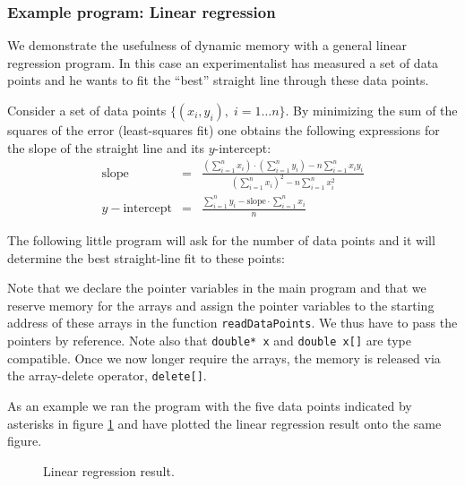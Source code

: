 
\subsubsection{Example program: Linear regression}

We demonstrate the usefulness of dynamic memory with a general linear regression
program. In this case an experimentalist has measured a set of data points and he
wants to fit the ``best'' straight line through these data points.

Consider a set of data points $\{(x_i,y_i), \; i=1 \dots n\}$.
By minimizing the sum of the squares of the error (least-squares fit) one obtains the
following expressions for the slope of the straight line and its $y$-intercept:
\begin{eqnarray}
  \mbox{slope} &=& \frac{\left( \sum_{i=1}^n x_i \right) \cdot \left( \sum_{i=1}^n y_i \right)
                      - n \sum_{i=1}^n x_i y_i }
                        {\left( \sum_{i=1}^n x_i \right)^2
                      - n \sum_{i=1}^n x_i^2 } \nonumber \\
  y-\mbox{intercept} &=& \frac{ \sum_{i=1}^n y_i - \mbox{slope} \cdot \sum_{i=1}^n x_i}
                                {n}  \nonumber
  \label{linearregression}
\end{eqnarray}

The following little program will ask for the number of data points and it
will determine the best straight-line fit to these points:

\noindent {\small }

Note that we declare the pointer variables in the main program and that we reserve memory
for the arrays and assign the pointer variables to the starting address of these arrays
in the function \verb+readDataPoints+. We thus have to pass the pointers by reference.
Note also that \verb+double* x+ and \verb+double x[]+ are type compatible. Once we now
longer require the arrays, the memory is released via the array-delete operator,
\verb+delete[]+.

As an example we ran the program with the five data points indicated by asterisks in
figure \ref{linear} and have plotted the linear regression result onto the same figure.

\begin{figure}[htb]
  \begin{center}
    
  \end{center}
  \caption{Linear regression result. \label{linear}}
\end{figure}


